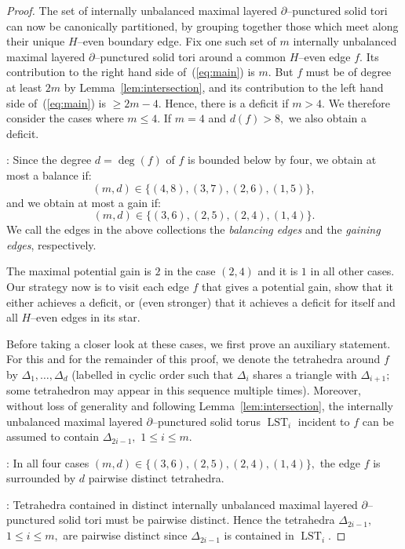 \documentclass[a4paper]{gtart}
\def\lst{\operatorname{LST}}
\theoremstyle{plain}
\theoremstyle{definition}
\theoremstyle{remark}
\numberwithin{equation}{section}
\begin{document}
\begin{proof}
\medskip

The set of internally unbalanced maximal layered $\partial$--punctured solid tori can now be canonically partitioned, by grouping together those which meet along their unique $H$--even boundary edge. Fix one such set of $m$ internally unbalanced maximal layered $\partial$--punctured solid tori around a common $H$--even edge $f.$ Its contribution to the right hand side of~(\ref{eq:main}) is $m.$ But $f$ must be of degree at least $2m$ by Lemma~\ref{lem:intersection}, and its contribution to the left hand side of~(\ref{eq:main}) is $\geq 2m-4.$ Hence, there is a deficit if $m > 4.$ We therefore consider the cases where $m \le 4.$ If $m=4$ and $d(f) > 8,$ we also obtain a deficit. 

:
Since the degree $d = \operatorname{deg}(f)$ of $f$ is bounded below by four, we obtain at most a balance if: 
\[(m,d) \in \{ (4,8),(3, 7), (2,6),(1,5) \},\]
and we obtain at most a gain if: 
\[(m,d) \in \{ (3,6),(2,5),(2,4),(1,4) \}.\]
We call the edges in the above collections the \emph{balancing edges} and the \emph{gaining edges}, respectively.

The maximal potential gain is $2$ in the case $(2,4)$ and it is $1$ in all other cases. Our strategy now is to visit each edge $f$ that gives a potential gain, show that it either achieves a deficit, or (even stronger) that it achieves a deficit for itself and all $H$--even edges in its star. 

Before taking a closer look at these cases, we first prove an auxiliary statement. For this and for the remainder of this proof, we denote the tetrahedra around $f$ by $\Delta_1, \ldots , \Delta_d$ (labelled in cyclic order such that $\Delta_i$ shares a triangle with $\Delta_{i+1};$ some tetrahedron may appear in this sequence multiple times). Moreover, without loss of generality and following Lemma~\ref{lem:intersection}, the internally unbalanced maximal layered $\partial$--punctured solid torus  $\lst_i$ incident to $f$ can be assumed to contain $\Delta_{2i - 1},$ $1 \leq i \leq m.$ 

\medskip

: In all four cases $(m,d) \in \{ (3,6),(2,5),(2,4),(1,4) \},$ the edge $f$ is surrounded by $d$ pairwise distinct tetrahedra. 


\medskip

: Tetrahedra contained in distinct internally unbalanced maximal layered $\partial$--punctured solid tori must be pairwise distinct. Hence the tetrahedra $\Delta_{2i - 1},$ $1 \leq i \leq m,$ are pairwise distinct since $\Delta_{2i - 1}$ is contained in $\lst_{i}.$ 


\end{proof}
\end{document}
